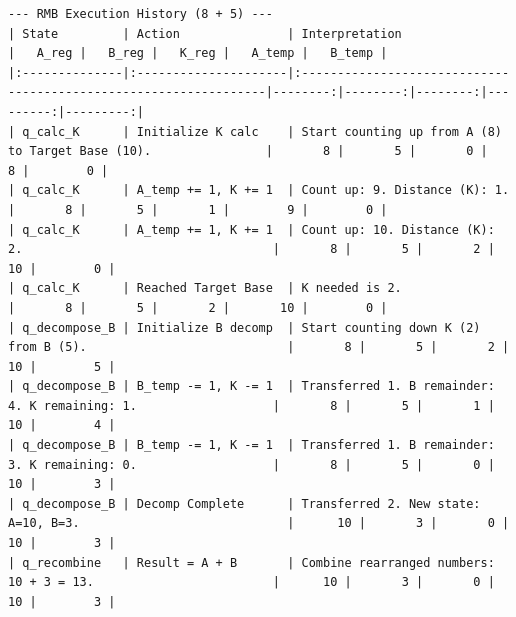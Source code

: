 \documentclass[11pt]{article}
\begin{document}



\begin{verbatim}
--- RMB Execution History (8 + 5) ---
| State         | Action               | Interpretation                                                   |   A_reg |   B_reg |   K_reg |   A_temp |   B_temp |
|:--------------|:---------------------|:-----------------------------------------------------------------|--------:|--------:|--------:|---------:|---------:|
| q_calc_K      | Initialize K calc    | Start counting up from A (8) to Target Base (10).                |       8 |       5 |       0 |        8 |        0 |
| q_calc_K      | A_temp += 1, K += 1  | Count up: 9. Distance (K): 1.                                    |       8 |       5 |       1 |        9 |        0 |
| q_calc_K      | A_temp += 1, K += 1  | Count up: 10. Distance (K): 2.                                   |       8 |       5 |       2 |       10 |        0 |
| q_calc_K      | Reached Target Base  | K needed is 2.                                                   |       8 |       5 |       2 |       10 |        0 |
| q_decompose_B | Initialize B decomp  | Start counting down K (2) from B (5).                            |       8 |       5 |       2 |       10 |        5 |
| q_decompose_B | B_temp -= 1, K -= 1  | Transferred 1. B remainder: 4. K remaining: 1.                   |       8 |       5 |       1 |       10 |        4 |
| q_decompose_B | B_temp -= 1, K -= 1  | Transferred 1. B remainder: 3. K remaining: 0.                   |       8 |       5 |       0 |       10 |        3 |
| q_decompose_B | Decomp Complete      | Transferred 2. New state: A=10, B=3.                             |      10 |       3 |       0 |       10 |        3 |
| q_recombine   | Result = A + B       | Combine rearranged numbers: 10 + 3 = 13.                         |      10 |       3 |       0 |       10 |        3 |
\end{verbatim}

\printbibliography
\end{document}
